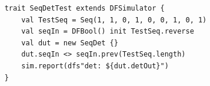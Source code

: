 \begin{figure}[h]
  \centering
  \captionsetup{justification=centering}    
  
  \begin{verbatim}
	trait SeqDetTest extends DFSimulator {
		val TestSeq = Seq(1, 1, 0, 1, 0, 0, 1, 0, 1)
		val seqIn = DFBool() init TestSeq.reverse
		val dut = new SeqDet {}
		dut.seqIn <> seqIn.prev(TestSeq.length)
		sim.report(dfs"det: ${dut.detOut}")
	}
  \end{verbatim}
  \label{fig:FibTest}
\end{figure}






%
%
%
%
%

